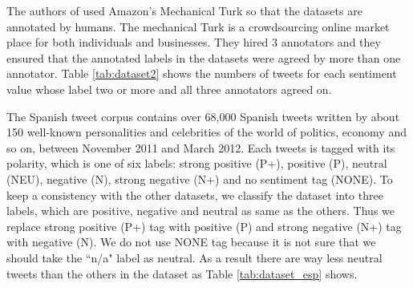 \begin{comment}
\begin{table}[ht]
	\caption{Number of dataset of each language}
	\centering
	\begin{tabular}{|c|r|} \hline
	Language & \# of dataset \\ \hline \hline
	English & 7,200  \\ \hline
	French & 1,797  \\ \hline
	German & 1,800  \\ \hline
	Spanish & 68,000  \\ \hline
	\end{tabular}
	\label{tab:dataset}
\end{table}
\end{comment}

The authors of used Amazon's Mechanical Turk \cite{mechanical_turk} so that the datasets are annotated by humans.
The mechanical Turk is a crowdsourcing online market place for both individuals and businesses.
They hired 3 annotators and they ensured that the annotated labels in the datasets were agreed by more than one annotator.
Table \ref{tab:dataset2} shows the numbers of tweets for each sentiment value whose label two or more and all three annotators agreed on.


The Spanish tweet corpus contains over 68,000 Spanish tweets written by about 150 well-known personalities and celebrities of the world of politics, economy and so on, between November 2011 and March 2012.
Each tweets is tagged with its polarity, which is one of six labels: strong positive (P+), positive (P), neutral (NEU), negative (N), strong negative (N+) and no sentiment tag (NONE).
To keep a consistency with the other datasets, we classify the dataset into three labels, which are positive, negative and neutral as same as the others.
Thus we replace strong positive (P+) tag with positive (P) and strong negative (N+) tag with negative (N).
We do not use NONE tag because it is not sure that we should take the ``n/a" label as neutral.
As a result there are way less neutral tweets than the others in the dataset as Table \ref{tab:dataset_esp} shows. 

